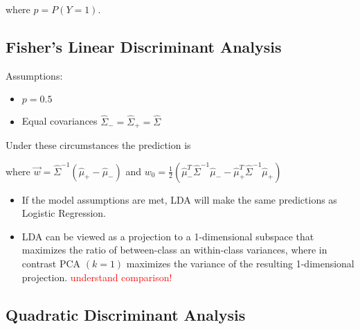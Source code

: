 \documentclass[10pt,a4paper]{scrartcl}
\begin{document}
\begin{multicols*}{2}
\begin{itemize}
\begin{itemize}

where $p=P(Y=1)$.
\end{itemize}

\end{itemize}

\subsection{Fisher's Linear Discriminant Analysis}

Assumptions:

\begin{itemize}
\item $p=0.5$
\item Equal covariances $\hat{\Sigma}_-=\hat{\Sigma}_+=\hat{\Sigma}$
\end{itemize}


Under these circumstances the prediction is


where $\vec{w}=\hat{\Sigma}^{-1}(\hat{\mu}_+-\hat{\mu}_-)$ and $w_0=\frac{1}{2}(\hat{\mu}_-^T\hat{\Sigma}^{-1}\hat{\mu}_--\hat{\mu}_+^T\hat{\Sigma}^{-1}\hat{\mu}_+)$

\begin{itemize}
\item If the model assumptions are met, LDA will make the same predictions as Logistic Regression.
\item LDA can be viewed as a projection to a 1-dimensional subspace that maximizes the ratio of between-class an within-class variances, where in contrast PCA $(k=1)$ maximizes the variance of the resulting 1-dimensional projection. \textcolor{red}{understand comparison!}
\end{itemize}

\subsection{Quadratic Discriminant Analysis}


\end{multicols*}
\end{document}
